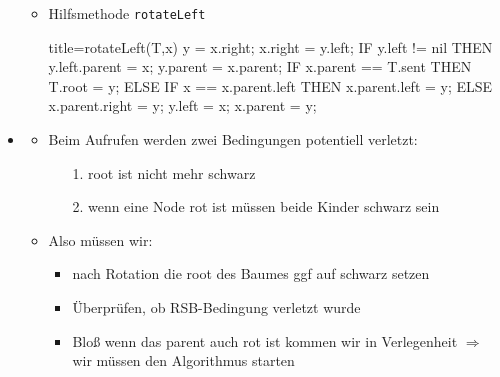 \documentclass[
    12pt,
    a4paper,
    ngerman,
    color=3b,%
    marginpar=false,
    colorback=false,
    leqno,
]{tudaexercise}
\begin{document}
\begin{itemize}
\begin{itemize}
                \item Hilfsmethode \texttt{rotateLeft}
                            \begin{ccode}[autogobble]{title={rotateLeft(T,x)}}
                            y = x.right;
                            x.right = y.left;
                            IF y.left != nil THEN
                                y.left.parent = x;
                            y.parent = x.parent;
                            IF x.parent == T.sent THEN
                                T.root = y;
                            ELSE
                                IF x == x.parent.left THEN
                                    x.parent.left = y;
                                ELSE
                                    x.parent.right = y;
                            y.left = x;
                            x.parent = y;
                            \end{ccode}
            \end{itemize}
\clearpage
        \item {}
        \begin{itemize}
            \item Beim Aufrufen werden zwei Bedingungen potentiell verletzt: 
            \begin{itemize}
                \item[1.] root ist nicht mehr schwarz
                \item[2.] wenn eine Node rot ist müssen beide Kinder schwarz sein
            \end{itemize}
            \item Also müssen wir:
            \begin{itemize}
                \item nach Rotation die root des Baumes ggf auf schwarz setzen
                \item Überprüfen, ob RSB-Bedingung verletzt wurde
                \item Bloß wenn das parent auch rot ist kommen wir in Verlegenheit $\Longrightarrow$ wir müssen den Algorithmus starten
            \end{itemize} 
            

\end{itemize}
\end{itemize}
\end{document}
